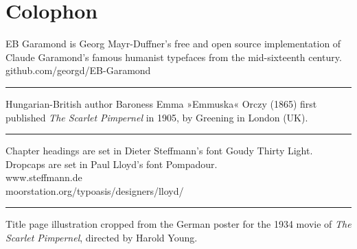 \documentclass[
a5paper,
BCOR=7mm,
twoside,
DIV=calc,
12pt,
usegeometry,
chapterprefix,
endperiod,
headings=big]{scrbook}
\newcommand{\moderatelyhuge}{\fontsize{50}{60}\selectfont}
\renewcommand*{\chaptermarkformat}{}
\renewcommand*{\chaptermarkformat}{%

\chapapp~\thechapter\autodot\enskip}
\begin{document}
\mainmatter
\renewcommand*{\chapterpagestyle}{plain}


\renewcommand*{\chaptermarkformat}{}

\headsep=10pt
\headheight=45pt
\footskip=30pt


































\chapter*{Colophon}

\centering
EB Garamond is Georg Mayr-Duffner's free and open source implementation of Claude Garamond's famous humanist typefaces from the mid-sixteenth century. \\github.com/georgd/EB-Garamond

\rule{0.5\textwidth}{.4pt}

Hungarian-British author Baroness Emma »Emmuska« Orczy (1865) first published \textit{The Scarlet Pimpernel} in 1905, by Greening in London (UK).

\rule{0.5\textwidth}{.4pt}

Chapter headings are set in Dieter Steffmann's font Goudy Thirty Light. Dropcaps are set in Paul Lloyd's font Pompadour.\\www.steffmann.de\\moorstation.org/typoasis/designers/lloyd/

\rule{0.5\textwidth}{.4pt}

Title page illustration cropped from the German poster for the 1934 movie of \textit{The Scarlet Pimpernel}, directed by Harold Young.
\end{document}
